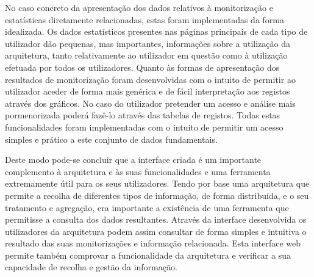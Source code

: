 No caso concreto da apresentação dos dados relativos à monitorização e estatísticas diretamente relacionadas, estas foram implementadas da forma idealizada. Os dados estatísticos presentes nas páginas principais de cada tipo de utilizador dão pequenas, mas importantes, informações sobre a utilização da arquitetura, tanto relativamente ao utilizador em questão como à utilização efetuada por todos os utilizadores. Quanto às formas de apresentação dos resultados de monitorização foram desenvolvidas com o intuito de permitir ao utilizador aceder de forma mais genérica e de fácil interpretação aos registos através dos gráficos. No caso do utilizador pretender um acesso e análise mais pormenorizada poderá fazê-lo através das tabelas de registos. Todas estas funcionalidades foram implementadas com o intuito de permitir um acesso simples e prático a este conjunto de dados fundamentais.

Deste modo pode-se concluir que a interface criada é um importante complemento à arquitetura e às suas funcionalidades e uma ferramenta extremamente útil para os seus utilizadores. Tendo por base uma arquitetura que permite a recolha de diferentes tipos de informação, de forma distribuída, e o seu tratamento e agregação, era importante a existência de uma ferramenta que permitisse a consulta dos dados resultantes. Através da interface desenvolvida os utilizadores da arquitetura podem assim consultar de forma simples e intuitiva o resultado das suas monitorizações e informação relacionada. Esta interface web permite também comprovar a funcionalidade da arquitetura e verificar a sua capacidade de recolha e gestão da informação.

